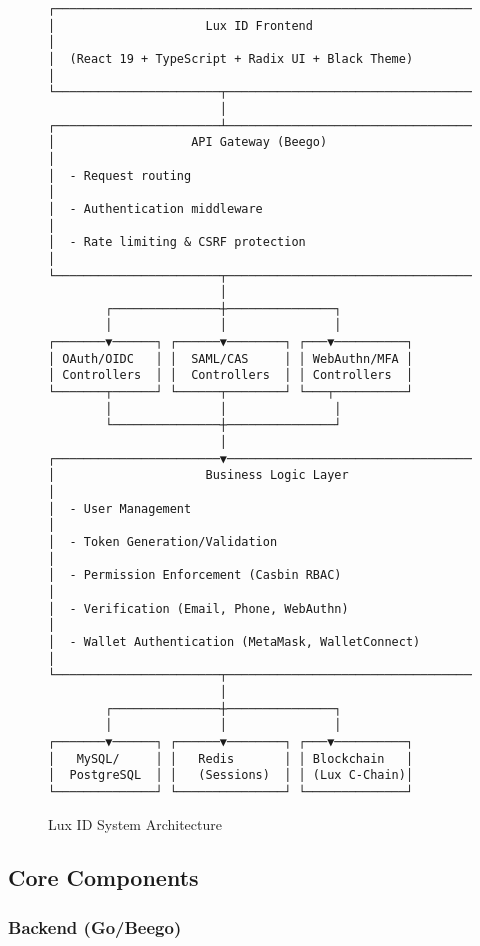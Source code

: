 \documentclass[11pt,a4paper]{article}
\begin{document}
\begin{figure}[h]
\centering
\begin{verbatim}
┌─────────────────────────────────────────────────────────────┐
│                     Lux ID Frontend                         │
│  (React 19 + TypeScript + Radix UI + Black Theme)          │
└───────────────────────┬─────────────────────────────────────┘
                        │
┌───────────────────────┴─────────────────────────────────────┐
│                   API Gateway (Beego)                       │
│  - Request routing                                          │
│  - Authentication middleware                                │
│  - Rate limiting & CSRF protection                          │
└───────────────────────┬─────────────────────────────────────┘
                        │
        ┌───────────────┼───────────────┐
        │               │               │
┌───────▼──────┐ ┌──────▼────────┐ ┌───▼──────────┐
│ OAuth/OIDC   │ │  SAML/CAS     │ │ WebAuthn/MFA │
│ Controllers  │ │  Controllers  │ │ Controllers  │
└───────┬──────┘ └──────┬────────┘ └───┬──────────┘
        │               │               │
        └───────────────┼───────────────┘
                        │
┌───────────────────────▼─────────────────────────────────────┐
│                     Business Logic Layer                    │
│  - User Management                                          │
│  - Token Generation/Validation                              │
│  - Permission Enforcement (Casbin RBAC)                     │
│  - Verification (Email, Phone, WebAuthn)                    │
│  - Wallet Authentication (MetaMask, WalletConnect)          │
└───────────────────────┬─────────────────────────────────────┘
                        │
        ┌───────────────┼───────────────┐
        │               │               │
┌───────▼──────┐ ┌──────▼────────┐ ┌───▼──────────┐
│   MySQL/     │ │   Redis       │ │ Blockchain   │
│  PostgreSQL  │ │   (Sessions)  │ │ (Lux C-Chain)│
└──────────────┘ └───────────────┘ └──────────────┘
\end{verbatim}
\caption{Lux ID System Architecture}
\end{figure}

\subsection{Core Components}

\subsubsection{Backend (Go/Beego)}
\end{document}
